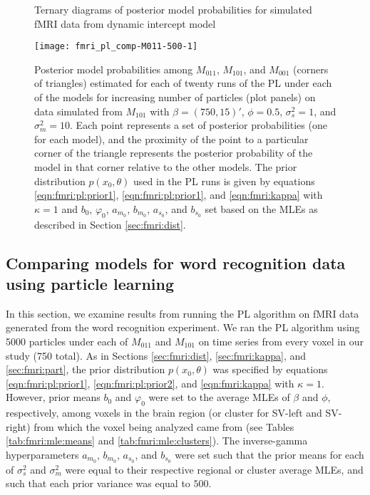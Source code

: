 \begin{figure}
\ssp
\centering
\caption{Ternary diagrams of posterior model probabilities for simulated fMRI data from dynamic intercept model} \label{fig:fmri:comp:M101}
\texttt{[image: fmri\_pl\_comp-M011-500-1]}
\caption*{Posterior model probabilities among $M_{011}$, $M_{101}$, and $M_{001}$ (corners of triangles) estimated for each of twenty runs of the PL under each of the models for increasing number of particles (plot panels) on data simulated from $M_{101}$ with $\beta = (750,15)'$, $\phi = 0.5$, $\sigma^2_s = 1$, and $\sigma^2_m = 10$. Each point represents a set of posterior probabilities (one for each model), and the proximity of the point to a particular corner of the triangle represents the posterior probability of the model in that corner relative to the other models. The prior distribution $p(x_0,\theta)$ used in the PL runs is given by equations \eqref{eqn:fmri:pl:prior1}, \eqref{eqn:fmri:pl:prior1}, and \eqref{eqn:fmri:kappa} with $\kappa = 1$ and $b_0$, $\varphi_0$, $a_{m_0}$, $b_{m_0}$, $a_{s_0}$, and $b_{s_0}$ set based on the MLEs as described in Section \ref{sec:fmri:dist}.}
\end{figure}

\subsection{Comparing models for word recognition data using particle learning \label{sec:fmri:real}}

In this section, we examine results from running the PL algorithm on fMRI data generated from the word recognition experiment. We ran the PL algorithm using 5000 particles under each of $M_{011}$ and $M_{101}$ on time series from every voxel in our study (750 total). As in Sections \ref{sec:fmri:dist}, \ref{sec:fmri:kappa}, and \ref{sec:fmri:part}, the prior distribution $p(x_0,\theta)$ was specified by equations \eqref{eqn:fmri:pl:prior1}, \eqref{eqn:fmri:pl:prior2}, and \eqref{eqn:fmri:kappa} with $\kappa = 1$. However, prior means $b_0$ and $\varphi_0$ were set to the average MLEs of $\beta$ and $\phi$, respectively, among voxels in the brain region (or cluster for SV-left and SV-right) from which the voxel being analyzed came from (see Tables \ref{tab:fmri:mle:means} and \ref{tab:fmri:mle:clusters}). The inverse-gamma hyperparameters $a_{m_0}$, $b_{m_0}$, $a_{s_0}$, and $b_{s_0}$ were set such that the prior means for each of $\sigma^2_s$ and $\sigma^2_m$ were equal to their respective regional or cluster average MLEs, and such that each prior variance was equal to $500$.

